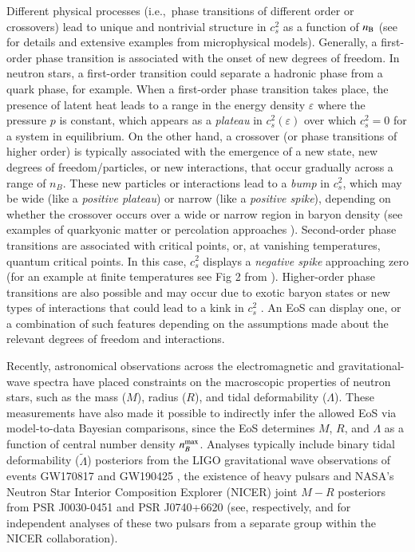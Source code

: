 \documentclass[aps,prd,nofootinbib,tightenlines,notitlepage,floatfix,superscriptaddress,showkeys,twocolumn]{revtex4-1}
\begin{document}
Different physical processes (i.e.,~phase transitions of different order or crossovers) lead to unique and nontrivial structure in $c_s^2$ as a function of $n_{\rm B}$  (see \cite{Tan:2021ahl} for details and extensive examples from microphysical models). 
%
Generally, a first-order phase transition is associated with the onset of new degrees of freedom. In neutron stars, a first-order transition could separate a hadronic phase from a quark phase, for example. When a first-order phase transition takes place, the presence of latent heat leads to a range in the energy density $\varepsilon$ where the pressure $p$ is constant, which appears as a \textit{plateau} in $c_s^2(\varepsilon)$ over which $c_s^2 = 0$ for a system in equilibrium. 
%
On the other hand, a crossover (or phase transitions of higher order) is typically associated with the emergence of a new state, new degrees of freedom/particles, or new interactions, that occur gradually across a range of $n_B$. 
These new particles or interactions lead to a \textit{bump} in $c_s^2$, which may be wide (like a \textit{positive plateau}) or narrow (like a \textit{positive spike}), depending on whether the crossover occurs over a wide or narrow region in baryon density (see examples of quarkyonic matter \cite{McLerran:2018hbz,Duarte:2023cki,Duarte:2021tsx,Duarte:2020kvi} or percolation approaches \cite{Kojo:2015fua}).
%
Second-order phase transitions are associated with critical points, or, at vanishing temperatures, quantum critical points. In this case, $c_s^2$ displays a \textit{negative spike} approaching zero (for an example at finite temperatures see Fig 2 from \cite{Dore:2022qyz}). Higher-order phase transitions are also possible and may occur due to exotic baryon states or new types of interactions that could lead to a kink in $c_s^2$ \cite{CMF_MUSES}. An EoS can display one, or a combination of such features depending on the assumptions made about the relevant degrees of freedom and interactions. 

Recently, astronomical observations across the electromagnetic and gravitational-wave spectra have placed constraints on the macroscopic properties of neutron stars, such as the mass ($M$), radius ($R$), and tidal deformability ($\Lambda$). These measurements have also made it possible to  indirectly infer the allowed EoS via model-to-data Bayesian comparisons, since the EoS determines $M$, $R$, and $\Lambda$ as a function of central number density $n_B^{\rm max}$. Analyses typically include binary tidal deformability ($\tilde{\Lambda}$) posteriors from the LIGO gravitational wave observations of events GW170817 \cite{LIGOScientific:2017vwq,De:2018uhw,LIGOScientific:2018cki} and GW190425 \cite{LIGOScientific:2020aai},
the existence of heavy pulsars \cite{arzoumanian2018nanograv, antoniadis2013massive,cromartie2020relativistic} and NASA's Neutron Star Interior Composition Explorer (NICER) joint $M-R$ posteriors from PSR J0030-0451 \cite{Miller:2019cac} and PSR J0740+6620 \cite{Miller:2021qha} (see, respectively, \cite{Riley:2019yda} and \cite{Riley:2021pdl} for independent analyses of these two pulsars from a separate group within the NICER collaboration). 
\end{document}
